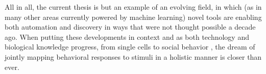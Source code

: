 All in all, the current thesis is but an example of an evolving field, in which (as in many other areas currently powered by machine learning) novel tools are enabling both automation and discovery in ways that were not thought possible a decade ago. When putting these developments in context and as both technology and biological knowledge progress, from single cells to social behavior \cite{Miranda2023IncreasingBehaviors}, the dream of jointly mapping behavioral responses to stimuli in a holistic manner is closer than ever.